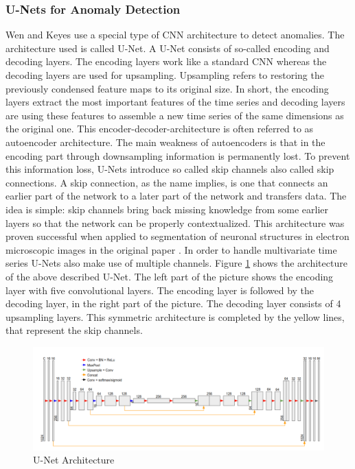 \subsubsection{U-Nets for Anomaly Detection} \label{U-Net}
Wen and Keyes \parencite*{Wen2019} use a special type of CNN architecture to detect anomalies. The architecture used is called U-Net. A U-Net consists of so-called encoding and decoding layers. The encoding layers work like a standard CNN whereas the decoding layers are used for upsampling. Upsampling refers to restoring the previously condensed feature maps to its original size. In short, the encoding layers extract the most important features of the time series and decoding layers are using these features to assemble a new time series of the same dimensions as the original one. This encoder-decoder-architecture is often referred to as autoencoder architecture. The main weakness of autoencoders is that in the encoding part through downsampling information is permanently lost. To prevent this information loss, U-Nets introduce so called skip channels also called skip connections. A skip connection, as the name implies, is one that connects an earlier part of the network to a later part of the network and transfers data. The idea is simple: skip channels bring back missing knowledge from some earlier layers so that the network can be properly contextualized. This architecture was proven successful when applied to segmentation of neuronal structures in electron microscopic images in the original paper \parencite{Cicek2016}. In order to handle multivariate time series U-Nets also make use of multiple channels. Figure \ref{fig:U-Net} shows the architecture of the above described U-Net. The left part of the picture shows the encoding layer with five convolutional layers. The encoding layer is followed by the decoding layer, in the right part of the picture. The decoding layer consists of 4 upsampling layers. This symmetric architecture is completed by the yellow lines, that represent the skip channels.

\begin{figure}[h]
	\centering
	\includegraphics[scale=0.32]{Figures/U-Net}
	\decoRule
	\caption[U-Net Architecture]{U-Net Architecture \parencite{Wen2019}}
	\label{fig:U-Net}
\end{figure}

